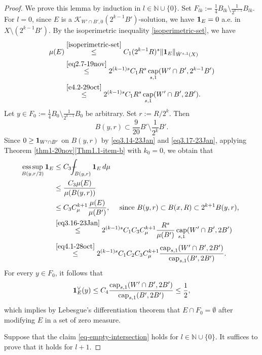 \documentclass[11pt,leqno]{amsart}
\def\Xint#1{\mathchoice
	{\XXint\displaystyle\textstyle{#1}}
	{\XXint\textstyle\scriptstyle{#1}}
	{\XXint\scriptstyle\scriptscriptstyle{#1}}
	{\XXint\scriptscriptstyle\scriptscriptstyle{#1}}
	\!\int}
\def\XXint#1#2#3{{\setbox0=\hbox{$#1{#2#3}{\int}$ }
		\vcenter{\hbox{$#2#3$ }}\kern-.6\wd0}}
\def\dashint{\Xint-}
\numberwithin{equation}{section}
\theoremstyle{definition}
\DeclareMathOperator{\capp}{cap}
\newcommand{\caps}{\capp_{s,1}}
\DeclareMathOperator*{\esssup}{ess\,sup}
\begin{document}
	\begin{proof}
		
		
		We prove this lemma by induction in  $l\in\mathbb N\cup\{0\}$. Set $F_{lk}:=\frac{1}{4}B_{lk}\setminus\frac{1}{2^{k-1}}B_{lk}$.
		For $l=0$, since $E$ is a $\mathcal{K}_{W'\cap B',0}(2^{k-1}B')$-solution, we have ${\bf 1}_E=0$ a.e. in $X\setminus (2^{k-1}B')$. 
		By the isoperimetric inequality \eqref{isoperimetric-set},
		we have
		\begin{align}
			\notag	\mu(E)
			&\overset{\eqref{isoperimetric-set}}{\le}C_1 (2^{k-1}R)^s \|{\bf 1}_E\|_{\dot W^{s,1}(X)}\\
			&\overset{\eqref{eq2.7-19nov}}{\le} 2^{(k-1)s}C_1 R^s \caps(W'\cap B',2^{k-1}B') \notag \\
			&\overset{\eqref{e4.2-29oct}}{\leq}2^{(k-1)s}C_1 R^s \caps(W'\cap B',2B').
			\label{eq3.16-23Jan}
		\end{align}
		Let 
		{$y\in F_0:=\frac{1}{4}B_0\setminus \frac{1}{2^{k-1}}B_0$}
		be arbitrary. Set $r:={R}/{2^k}$. Then
		\begin{equation}\label{eq3.17-23Jan}B(y,r)\subset \frac{9}{20}B'\setminus \frac{1}{2^k}B'.
		\end{equation}
		Since 
		{$0\geq {\bf 1}_{W'\cap B'}$}
		on $B(y,r)$ by \eqref{eq3.14-23Jan} and \eqref{eq3.17-23Jan}, applying Theorem \ref{thm1-20nov}\ref{Thm1.1-item-b} with $k_0=0$, we obtain that
		\begin{align*}
			\esssup_{B(y,r/2)}{\bf 1}_E
			&\le C_3  \dashint_{B(y,r)}{\bf 1}_E\,d\mu\\
			&\le   \frac{C_3\mu(E)}{\mu(B(y,r))}\\
			&\le C_3C_{\mu}^{k+1} \frac{\mu(E)}{\mu(B')}, 
			\quad \text{ since $B(y,r)\subset B(x,R)\subset 2^{k+1}B(y,r)$, }
			\\
			&\overset{\eqref{eq3.16-23Jan}}{\le}2^{(k-1)s} C_1C_3C_{\mu}^{k+1} \frac{R^s}{\mu(B')}\caps(W'\cap B',2B')\\
			&\overset{\eqref{eq4.1-28oct}}{\le }2^{(k-1)s} C_1C_2C_3C_{\mu}^{k+1} 
			\frac{\caps(W'\cap B',2B')}{\caps(B',2B')}.
		\end{align*}
		For every $y\in F_0$, it follows that
		\begin{equation*}
			{\bf 1}_{E}^\vee(y)
			\le C_4
			\frac{\caps(W'\cap B',2B')}{\caps(B',2B')}\le\frac{1}{2},
		\end{equation*}
		which implies by Lebesgue's differentiation theorem that $E\cap F_0=\emptyset$
		after modifying $E$ in a set of zero measure.
		
		Suppose that the claim \eqref{eq-empty-intersection} holds for
		$l\in\mathbb N\cup\{0\}$. It suffices to prove that it holds for $l+1$.
		

\end{proof}
\end{document}
